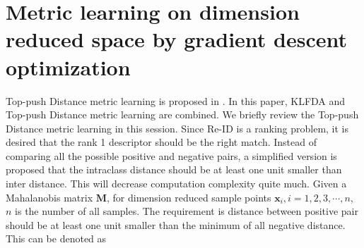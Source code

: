 \documentclass[10pt,twocolumn,letterpaper]{article}
\begin{document}
\section{Metric learning on dimension reduced space by gradient descent optimization}
Top-push Distance metric learning is proposed in \cite{TDL}. In this paper, KLFDA and Top-push Distance metric learning are combined. We briefly review the Top-push Distance metric learning in this session. Since Re-ID is a ranking problem, it is desired that the rank 1 descriptor should be the right match. Instead of comparing all the possible positive and negative pairs, a simplified version is proposed that the intraclass distance should be at least one unit smaller than inter distance. This will decrease computation complexity quite much. Given a Mahalanobis matrix $\bm{M}$, for dimension reduced sample points $\bm{x}_i, i = 1,2,3,\cdots,n$, $n$ is the number of all samples. The requirement is distance between positive pair should be at least one unit smaller than the minimum of all negative distance. This can be denoted as 
\end{document}
